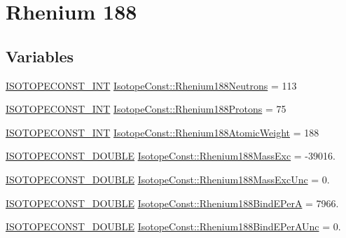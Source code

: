 \hypertarget{group___isotope_const-_rhenium-_re188}{}\section{Rhenium 188}
\label{group___isotope_const-_rhenium-_re188}
\subsection*{Variables}
\begin{DoxyCompactItemize}
\item 
\mbox{\hyperlink{group___isotope_const-_macros_ga5f18360b3e99483a35c32d789e62621c}{I\+S\+O\+T\+O\+P\+E\+C\+O\+N\+S\+T\+\_\+\+I\+NT}} \mbox{\hyperlink{group___isotope_const-_rhenium-_re188_ga2a0c305bf9dbae4d68fbd53ccd16de65}{Isotope\+Const\+::\+Rhenium188\+Neutrons}} = 113
\item 
\mbox{\hyperlink{group___isotope_const-_macros_ga5f18360b3e99483a35c32d789e62621c}{I\+S\+O\+T\+O\+P\+E\+C\+O\+N\+S\+T\+\_\+\+I\+NT}} \mbox{\hyperlink{group___isotope_const-_rhenium-_re188_ga7abccf71dba96a28be5d51800bc3f942}{Isotope\+Const\+::\+Rhenium188\+Protons}} = 75
\item 
\mbox{\hyperlink{group___isotope_const-_macros_ga5f18360b3e99483a35c32d789e62621c}{I\+S\+O\+T\+O\+P\+E\+C\+O\+N\+S\+T\+\_\+\+I\+NT}} \mbox{\hyperlink{group___isotope_const-_rhenium-_re188_ga9642fcd8bbd29c40ac25001ce5505c94}{Isotope\+Const\+::\+Rhenium188\+Atomic\+Weight}} = 188
\item 
\mbox{\hyperlink{group___isotope_const-_macros_ga8f45a7272ce02c0b4c65c44636ed719a}{I\+S\+O\+T\+O\+P\+E\+C\+O\+N\+S\+T\+\_\+\+D\+O\+U\+B\+LE}} \mbox{\hyperlink{group___isotope_const-_rhenium-_re188_ga50a58b6ca80ed97cad9ab625771ebccc}{Isotope\+Const\+::\+Rhenium188\+Mass\+Exc}} = -\/39016.
\item 
\mbox{\hyperlink{group___isotope_const-_macros_ga8f45a7272ce02c0b4c65c44636ed719a}{I\+S\+O\+T\+O\+P\+E\+C\+O\+N\+S\+T\+\_\+\+D\+O\+U\+B\+LE}} \mbox{\hyperlink{group___isotope_const-_rhenium-_re188_ga455b2bd07aa22dfd66088220a70c8ee1}{Isotope\+Const\+::\+Rhenium188\+Mass\+Exc\+Unc}} = 0.
\item 
\mbox{\hyperlink{group___isotope_const-_macros_ga8f45a7272ce02c0b4c65c44636ed719a}{I\+S\+O\+T\+O\+P\+E\+C\+O\+N\+S\+T\+\_\+\+D\+O\+U\+B\+LE}} \mbox{\hyperlink{group___isotope_const-_rhenium-_re188_gab9a7adacc45faca522f2e16a24af9132}{Isotope\+Const\+::\+Rhenium188\+Bind\+E\+PerA}} = 7966.
\item 
\mbox{\hyperlink{group___isotope_const-_macros_ga8f45a7272ce02c0b4c65c44636ed719a}{I\+S\+O\+T\+O\+P\+E\+C\+O\+N\+S\+T\+\_\+\+D\+O\+U\+B\+LE}} \mbox{\hyperlink{group___isotope_const-_rhenium-_re188_gadc210607fcacbf4c6810b5132f17742b}{Isotope\+Const\+::\+Rhenium188\+Bind\+E\+Per\+A\+Unc}} = 0.

\end{DoxyCompactItemize}
